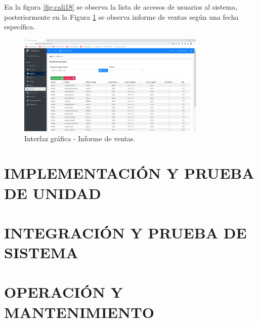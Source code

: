 	\vspace{-0.6cm} %
	
	En la figura \ref{fig:cali18} se observa la lista de accesos de usuarios al sistema, posteriormente en la Figura \ref{fig:cali19} se observa informe de ventas según una fecha específica.
	
	\vspace{0.3cm} %
	
	\begin{figure}[!h] %
		\caption[Interfaz gráfica - Informe de ventas]
		{\newline Interfaz gráfica - Informe de ventas.} %
		\centering
		\includegraphics[width=0.8\textwidth]{imagenes/cap_3/Img_calibus/CALIBUS19.png} %
		
		\begin{flushleft}
		\end{flushleft}
		\vspace{-16pt}
		\label{fig:cali19} %
	\end{figure}
	
	
	
\section{IMPLEMENTACIÓN Y PRUEBA DE UNIDAD}
\section{INTEGRACIÓN Y PRUEBA DE SISTEMA}
\section{OPERACIÓN Y MANTENIMIENTO}
